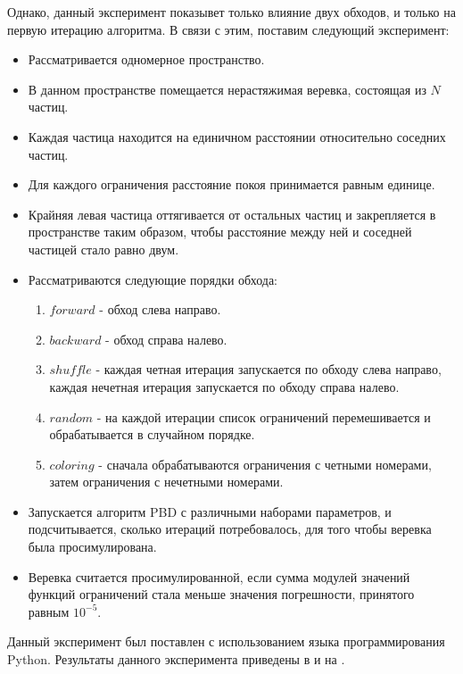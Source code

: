 	Однако, данный эксперимент показывет только влияние двух обходов, и только на первую итерацию алгоритма. В связи с этим, поставим следующий эксперимент:
	
	\begin{itemize}
		\item Рассматривается одномерное пространство.
		\item В данном пространстве помещается нерастяжимая веревка, состоящая из $N$ частиц.
		\item Каждая частица находится на единичном расстоянии относительно соседних частиц.
		\item Для каждого ограничения расстояние покоя принимается равным единице.
		\item Крайняя левая частица оттягивается от остальных частиц и закрепляется в пространстве таким образом, чтобы расстояние между ней и соседней частицей стало равно двум.
		\item Рассматриваются следующие порядки обхода:
			\begin{enumerate}[1.]
				\item $forward$ - обход слева направо.
				\item $backward$ - обход справа налево.
				\item $shuffle$ - каждая четная итерация запускается по обходу слева направо, каждая нечетная итерация запускается по обходу справа налево.
				\item $random$ - на каждой итерации список ограничений перемешивается и обрабатывается в случайном порядке.
				\item $coloring$ - сначала обрабатываются ограничения с четными номерами, затем ограничения с нечетными номерами.
			\end{enumerate}
		\item Запускается алгоритм PBD с различными наборами параметров, и подсчитывается, сколько итераций потребовалось, для того чтобы веревка была просимулирована.
		\item Веревка считается просимулированной, если сумма модулей значений функций ограничений стала меньше значения погрешности, принятого равным $10^{-5}$.
	\end{itemize}
	
	Данный эксперимент был поставлен с использованием языка программирования Python. Результаты данного эксперимента приведены в  и на .
	
